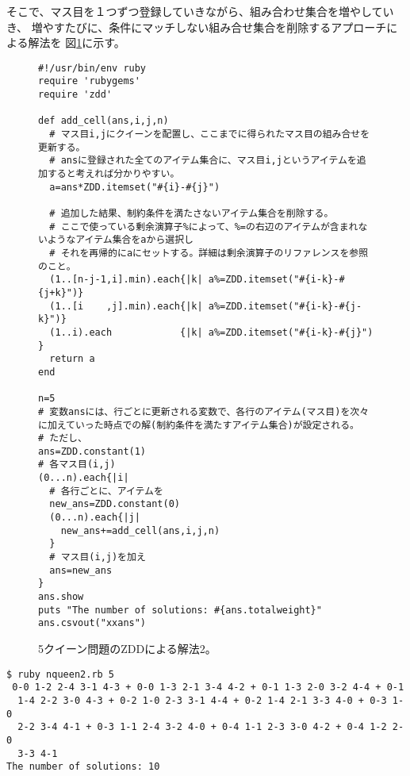 そこで、マス目を１つずつ登録していきながら、組み合わせ集合を増やしていき、
増やすたびに、条件にマッチしない組み合せ集合を削除するアプローチによる解法を
図\ref{fig:tut_nqueen_scp2}に示す。

\begin{figure}[!hbt]
{\small
\begin{Verbatim}[baselinestretch=0.7,frame=single]
#!/usr/bin/env ruby
require 'rubygems'
require 'zdd'

def add_cell(ans,i,j,n)
  # マス目i,jにクイーンを配置し、ここまでに得られたマス目の組み合せを更新する。
  # ansに登録された全てのアイテム集合に、マス目i,jというアイテムを追加すると考えれば分かりやすい。
  a=ans*ZDD.itemset("#{i}-#{j}")

  # 追加した結果、制約条件を満たさないアイテム集合を削除する。
  # ここで使っている剰余演算子%によって、%=の右辺のアイテムが含まれないようなアイテム集合をaから選択し
  # それを再帰的にaにセットする。詳細は剰余演算子のリファレンスを参照のこと。
  (1..[n-j-1,i].min).each{|k| a%=ZDD.itemset("#{i-k}-#{j+k}")}
  (1..[i    ,j].min).each{|k| a%=ZDD.itemset("#{i-k}-#{j-k}")}
  (1..i).each            {|k| a%=ZDD.itemset("#{i-k}-#{j}")  }
  return a
end

n=5
# 変数ansには、行ごとに更新される変数で、各行のアイテム(マス目)を次々に加えていった時点での解(制約条件を満たすアイテム集合)が設定される。
# ただし、
ans=ZDD.constant(1)
# 各マス目(i,j)
(0...n).each{|i|
  # 各行ごとに、アイテムを
  new_ans=ZDD.constant(0)
  (0...n).each{|j|
    new_ans+=add_cell(ans,i,j,n)
  }
  # マス目(i,j)を加え
  ans=new_ans
}
ans.show
puts "The number of solutions: #{ans.totalweight}"
ans.csvout("xxans")
\end{Verbatim}
}
\caption{5クイーン問題のZDDによる解法2。\label{fig:tut_nqueen_scp2}}
\end{figure}

\begin{Verbatim}[baselinestretch=0.7,frame=single]
$ ruby nqueen2.rb 5
 0-0 1-2 2-4 3-1 4-3 + 0-0 1-3 2-1 3-4 4-2 + 0-1 1-3 2-0 3-2 4-4 + 0-1
  1-4 2-2 3-0 4-3 + 0-2 1-0 2-3 3-1 4-4 + 0-2 1-4 2-1 3-3 4-0 + 0-3 1-0
  2-2 3-4 4-1 + 0-3 1-1 2-4 3-2 4-0 + 0-4 1-1 2-3 3-0 4-2 + 0-4 1-2 2-0
  3-3 4-1
The number of solutions: 10
\end{Verbatim}
\fi
